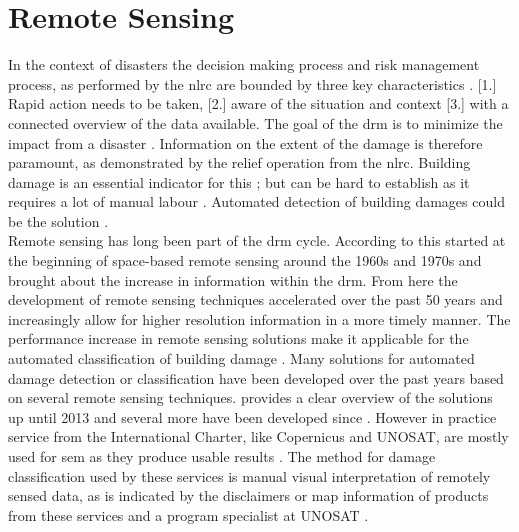 \section{Remote Sensing}
In the context of disasters the decision making process and risk management process, as performed by the \ac{nlrc} are bounded by three key characteristics \citep{Zlatanova2008}. [1.] Rapid action needs to be taken, [2.] aware of the situation and context [3.] with a connected overview of the data available. The goal of the \ac{drm} is to minimize the impact from a disaster \citep{Piero2012}. Information on the extent of the damage is therefore paramount, as demonstrated by the relief operation from the \ac{nlrc}. Building damage is an essential indicator for this \citep{Schweier2006}; but can be hard to establish as it requires a lot of manual labour \citep{Kerle2010}. Automated detection of building damages could be the solution \citep{Vetrivel2016b}. \\
Remote sensing has long been part of the \ac{drm} cycle. According to \citet{Kerle2015} this started at the beginning of space-based remote sensing around the 1960s and 1970s and brought about the increase in information within the \ac{drm}. From here the development of remote sensing techniques accelerated over the past 50 years and increasingly allow for higher resolution information in a more timely manner. The performance increase in remote sensing solutions make it applicable for the automated classification of building damage \citep{DellAcqua2012,Dong2013}. Many solutions for automated damage detection or classification have been developed over the past years based on several remote sensing techniques. \citet{Dong2013} provides a clear overview of the solutions up until 2013 and several more have been developed since \citep{Dominici2017,Sharma2017,Kakooei2017,Vetrivel2016b,Menderes2015}. However in practice service from the International Charter, like Copernicus and UNOSAT, are mostly used for \ac{sem} \citep{Voigt2016} as they produce usable results \citep{Kerle2010}. The method for damage classification used by these services is manual visual interpretation of remotely sensed data, as is indicated by the disclaimers or map information of products from these services and a program specialist at UNOSAT \citep{Cop2017,UNDAC2017}.

